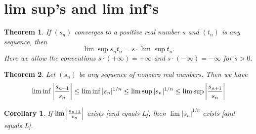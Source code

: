 \documentclass[12pt, lettersize]{book}
\theoremstyle{plain}
\newtheorem{thm}{Theorem}[section]
\newtheorem{cor}{Corollary}[thm]
\theoremstyle{definition}
\theoremstyle{remark}
\begin{document}
		\newpage
		
	\section{lim sup's and lim inf's}
		\setcounter{equation}{0}
		\begin{thm}\label{thm:12.1}
		If $(s_n)$ converges to a positive real number $s$ and $(t_n)$ is any sequence, then
		\begin{displaymath}
			\lim\sup s_nt_n=s\cdot\lim\sup t_n.
		\end{displaymath}
		Here we allow the conventions $s\cdot(+\infty)=+\infty$ and $s\cdot(-\infty)=-\infty$ for $s>0$.
		\end{thm}
		
		\setcounter{equation}{0}
		\begin{thm}\label{thm:12.2}
		Let $(s_n)$ be any sequence of nonzero real numbers. Then we have
		\begin{displaymath}
		\lim\inf\abs{\frac{s_{n+1}}{s_n}}\leq\lim\inf|s_n|^{1/n}\leq\lim\sup|s_n|^{1/n}\leq\lim\sup\abs{\frac{s_{n+1}}{s_n}}
		\end{displaymath}
		\end{thm}
		
		\begin{cor}\label{def:12.3}
		If $\lim\abs{\frac{s_{n+1}}{s_n}}$ exists [and equals L], then $\lim|s_n|^{1/n}$ exists [and equals L].
		\end{cor}
		
		\newpage
\end{document}
